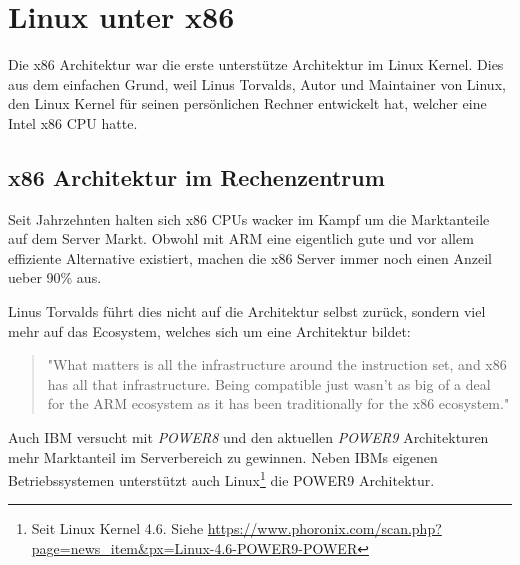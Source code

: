 \chapter{Linux unter x86}
\label{cha:Linux_x86}

Die x86 Architektur war die erste unterstütze Architektur im Linux Kernel.
Dies aus dem einfachen Grund, weil Linus Torvalds, Autor und Maintainer von Linux, den Linux Kernel für seinen persönlichen Rechner entwickelt hat,
welcher eine Intel x86 CPU hatte.

\section{x86 Architektur im Rechenzentrum}

Seit Jahrzehnten halten sich x86 CPUs wacker im Kampf um die Marktanteile auf dem Server Markt.
Obwohl mit ARM eine eigentlich gute und vor allem effiziente Alternative existiert, machen die x86 Server immer noch einen Anzeil ueber 90\% aus.\cite{ARMServer}\cite{CommonWhyx86}

Linus Torvalds führt dies nicht auf die Architektur selbst zurück, sondern viel mehr auf das Ecosystem, welches sich um eine Architektur bildet:

\begin{quote}
"What matters is all the infrastructure around the instruction set, and x86 has all that infrastructure.
Being compatible just wasn’t as big of a deal for the ARM ecosystem as it has been traditionally for the x86 ecosystem."\cite{TorvalsQuote}
\end{quote}

Auch IBM versucht mit \textit{POWER8} und den aktuellen \textit{POWER9} Architekturen mehr Marktanteil im Serverbereich zu gewinnen.\cite{CommonWhyx86}
Neben IBMs eigenen Betriebssystemen unterstützt auch Linux\footnote{Seit Linux Kernel 4.6. Siehe \url{https://www.phoronix.com/scan.php?page=news_item&px=Linux-4.6-POWER9-POWER}} die POWER9 Architektur.
